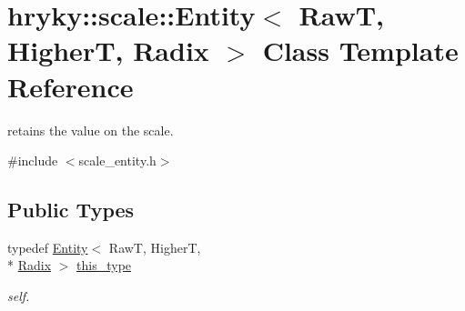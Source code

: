 \hypertarget{classhryky_1_1scale_1_1_entity}{\section{hryky\-:\-:scale\-:\-:Entity$<$ Raw\-T, Higher\-T, Radix $>$ Class Template Reference}
\label{classhryky_1_1scale_1_1_entity}
}


retains the value on the scale.  




{\ttfamily \#include $<$scale\-\_\-entity.\-h$>$}

\subsection*{Public Types}
\begin{DoxyCompactItemize}
\item 
\hypertarget{classhryky_1_1scale_1_1_entity_af312f46dc3d31369144a960d386790c3}{typedef \hyperlink{classhryky_1_1scale_1_1_entity}{Entity}$<$ Raw\-T, Higher\-T, \\*
\hyperlink{classhryky_1_1scale_1_1_radix}{Radix} $>$ \hyperlink{classhryky_1_1scale_1_1_entity_af312f46dc3d31369144a960d386790c3}{this\-\_\-type}}\label{classhryky_1_1scale_1_1_entity_af312f46dc3d31369144a960d386790c3}

\begin{DoxyCompactList}\small\item\em self. \end{DoxyCompactList}\end{DoxyCompactItemize}
